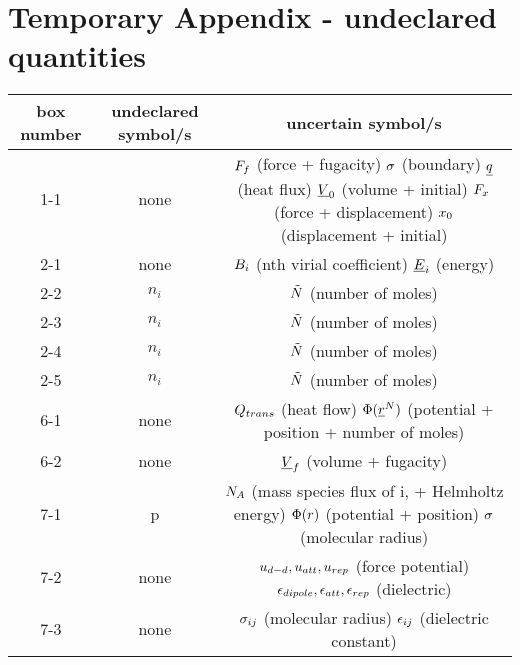 \section{Temporary Appendix - undeclared quantities}

\begin{tabular} { | c | c | c | } 
 \hline
    \textbf{box number}
    & \textbf{undeclared symbol/s} 
    & \textbf{uncertain symbol/s} \\
 \hline
    1-1 & none & \shortstack{$\force_{\fug}$ (force + fugacity)\\ $\bound$ (boundary) \\ $\uline{\heatflux}$ (heat flux) \\ $\uline{\vol}_{\init}$ (volume + initial) \\ $\force_{\disp}$ (force + displacement)\\ $\disp_{\init}$ (displacement + initial)}\\  \hline
    2-1 & none & \shortstack{$\virialcoeff{i}$ (nth virial coefficient) \\ $\uline{\energy}_{i}$ (energy) }\\ \hline
    2-2 & $n_{i}$ & $\tilde{\nummoles}$ (number of moles) \\ \hline
    2-3 & $n_{i}$ & $\tilde{\nummoles}$ (number of moles) \\ \hline
    2-4 & $n_{i}$ & $\tilde{\nummoles}$ (number of moles) \\ \hline
    2-5 & $n_{i}$ & $\tilde{\nummoles}$ (number of moles) \\ \hline
    6-1 & none & \shortstack{$\heatflow_{trans}$ (heat flow) \\ $\pot(\uline{\pos}^{\nummoles})$ (potential + position + number of moles)} \\ \hline
    6-2 & none & $\uline{\vol}_{\fug}$ (volume + fugacity) \\ \hline
    7-1 & p & \shortstack{$\massspecflux{\helmholtz}$ (mass species flux of i, + Helmholtz energy) \\ $\pot(\pos)$ (potential + position) \\ $\molecrad$ (molecular radius)} \\ \hline
    7-2 & none & \shortstack{$\forcepot_{d-d}, \forcepot_{att}, \forcepot_{rep}$ (force potential) \\ $\dielec_{dipole}, \dielec_{att}, \dielec_{rep}$ (dielectric)} \\ \hline
    7-3 & none & \shortstack{$\molecrad_{ij}$ (molecular radius) \\ $\dielec_{ij}$ (dielectric constant)} \\ \hline

\end{tabular}
